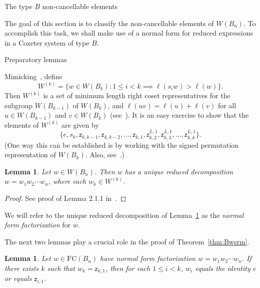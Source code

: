 \documentclass[12pt]{amsart}
\newtheorem{lem}[thm]{Lemma}
\newcommand{\z}{\mathsf{z}}
\renewcommand{\(}{\left(}
\renewcommand{\)}{\right)}
\newcommand{\FC}{\mathrm{FC}}
\begin{document}

\begin{section}{The type $B$ non-cancellable elements}\label{sec:Bwsrm}

The goal of this section is to classify the non-cancellable elements of $W(B_{n})$.  To accomplish this task, we shall make use of a normal form for reduced expressions in a Coxeter system of type $B$.


\begin{subsection}{Preparatory lemmas}

Mimicking~\cite[]{Green.R;Losonczy.J:E}, define 
\[
W^{(k)}=\{w\in W(B_{k}): 1\leq i<k \implies \ell(s_{i}w)>\ell(w)\}.
\]
Then $W^{(k)}$ is a set of minimum length right coset representatives for the subgroup $W(B_{k-1})$ of $W(B_{k})$, and $\ell(uv)=\ell(u)+\ell(v)$ for all $u\in W(B_{k-1})$ and $v\in W(B_{k})$ (see~\cite[]{Humphreys.J:A}).  It is an easy exercise to show that the elements of $W^{(k)}$ are given by
\[
\{e, s_{k},\z_{k,k-1},\z_{k,k-2},\ldots,\z_{k,1},\z_{k,2}^{L,1},\z_{k,3}^{L,1},\ldots,\z_{k,k}^{L,1}\}.
\]
(One way this can be established is by working with the signed permutation representation of $W(B_{k})$.  Also, see~\cite[]{Green.R;Losonczy.J:E}.)

\begin{lem}\label{lem:normal form}
Let $w \in W(B_{n})$.  Then $w$ has a unique reduced decomposition $w=w_{1}w_{2}\cdots w_{n}$, where each $w_{k}\in W^{(k)}$.
\end{lem}

\begin{proof}
See proof of Lemma 2.1.1 in~\cite{Green.R;Losonczy.J:E}.
\end{proof}

We will refer to the unique reduced decomposition of Lemma~\ref{lem:normal form} as the \emph{normal form factorization} for $w$.

The next two lemmas play a crucial role in the proof of Theorem~\ref{thm:Bwsrm}.

\begin{lem}\label{lem:above_diagonal}
Let $w\in \FC(B_{n})$ have normal form factorization $w=w_{1}w_{2}\cdots w_{n}$.  If there exists $k$ such that $w_{k}=\z_{k,1}$, then for each $1\leq i<k$, $w_{i}$ equals the identity $e$ or equals $\z_{i,1}$.
\end{lem}


\end{subsection}
\end{section}
\end{document}
